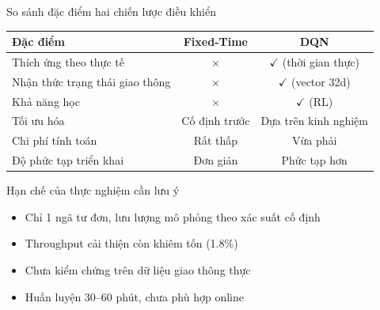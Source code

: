 \begin{frame}{So sánh đặc điểm hai chiến lược điều khiển}
  \begin{center}
  \renewcommand{\arraystretch}{1.3}
  \begin{tabular}{lcc}
    \toprule
    \textbf{Đặc điểm} & \textbf{Fixed-Time} & \textbf{DQN}\\
    \midrule
    Thích ứng theo thực tế      & \textcolor{vnred}{\large\textbf{$\times$}} & \textcolor{techgreen}{\large\textbf{$\checkmark$}} (thời gian thực)\\
    Nhận thức trạng thái giao thông & \textcolor{vnred}{\large\textbf{$\times$}} & \textcolor{techgreen}{\large\textbf{$\checkmark$}} (vector 32d)\\
    Khả năng học                & \textcolor{vnred}{\large\textbf{$\times$}} & \textcolor{techgreen}{\large\textbf{$\checkmark$}} (RL)\\
    Tối ưu hóa                  & Cố định trước & Dựa trên kinh nghiệm\\
    Chi phí tính toán           & \textcolor{techgreen}{Rất thấp} & Vừa phải\\
    Độ phức tạp triển khai      & \textcolor{techgreen}{Đơn giản} & Phức tạp hơn\\
    \bottomrule
  \end{tabular}
  \end{center}

  \vspace{8pt}
  \begin{alertblock}{Hạn chế của thực nghiệm cần lưu ý}
    \begin{itemize}
      \item Chỉ 1 ngã tư đơn, lưu lượng mô phỏng theo xác suất cố định
      \item Throughput cải thiện còn khiêm tốn (1.8\%)
      \item Chưa kiểm chứng trên dữ liệu giao thông thực
      \item Huấn luyện 30--60 phút, chưa phù hợp online
    \end{itemize}
  \end{alertblock}
\end{frame}


